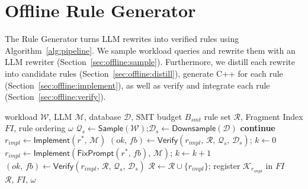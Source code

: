 \section{Offline Rule Generator}
\label{sec:rule_generator}
The Rule Generator turns LLM rewrites into verified rules using Algorithm~\ref{alg:pipeline}.
We sample workload queries and rewrite them with an LLM rewriter (Section~\ref{sec:offline:sample}).
Furthermore, we distill each rewrite into candidate rules (Section~\ref{sec:offline:distill}), generate C++ for each rule (Section~\ref{sec:offline:implement}), as well as verify and integrate each rule (Section~\ref{sec:offline:verify}).


\begin{algorithm}[b]\fontsize{7.9}{0}
\caption{Rule Generation Pipeline}
\label{alg:pipeline}
\begin{algorithmic}[1]
\REQUIRE workload $\mathcal{W}$, LLM $\mathcal{M}$, database $\mathcal{D}$, SMT budget $B_{\mathit{smt}}$
\ENSURE rule set $\mathcal{R}$, Fragment Index $\mathit{FI}$, rule ordering $\omega$
\STATE \label{pipeline:sample} $\mathcal{Q}_s \leftarrow \textsf{Sample}(\mathcal{W})$;\quad $\mathcal{D}_s \leftarrow \textsf{Downsample}(\mathcal{D})$
  \STATE \label{pipeline:rewrite}  
    \STATE \label{pipeline:skip} \textbf{continue} 
  \ENDIF
    \STATE \label{pipeline:implement} $r_{\mathit{impl}} \leftarrow \textsf{Implement}(r^*,\, \mathcal{M})$ 
    \STATE \label{pipeline:verify} $(\mathit{ok},\, \mathit{fb}) \leftarrow \textsf{Verify}(r_{\mathit{impl}},\, \mathcal{R},\, \mathcal{Q}_s,\, \mathcal{D}_s)$; $\mathit{k} \leftarrow 0$
      \STATE $r_{\mathit{impl}} \leftarrow \textsf{Implement}(\textsf{FixPrompt}(r^*,\, \mathit{fb}),\, \mathcal{M})$; $\mathit{k} \leftarrow \mathit{k}+1$
      \STATE \label{pipeline:retry} $(\mathit{ok},\, \mathit{fb}) \leftarrow \textsf{Verify}(r_{\mathit{impl}},\, \mathcal{R},\, \mathcal{Q}_s,\, \mathcal{D}_s)$
    \ENDWHILE
      \STATE \label{pipeline:integrate} $\mathcal{R} \leftarrow \mathcal{R} \cup \{r_{\mathit{impl}}\}$; register $\mathcal{K}_{r_{\mathit{impl}}}$ in $\mathit{FI}$ 
    \ENDIF
  \ENDFOR
\ENDFOR
\STATE \label{pipeline:order}  
\RETURN $\mathcal{R},\, \mathit{FI},\, \omega$
\end{algorithmic}
\end{algorithm}

